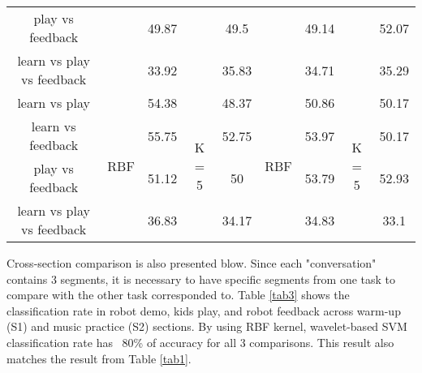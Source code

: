 \begin{sidewaystable}[tbp]
\begin{center}
{\begin{tabular}{ccccccccc}
			play vs feedback                                   &                             & 49.87    &                        & 49.5     &                             & 49.14    &                        & 52.07    \\
			learn vs play vs feedback                                 &                             & 33.92    &                        & 35.83    &                             & 34.71    &                        & 35.29    \\
			\hline
			learn vs play                                   & \multirow{4}{*}{RBF}        & 54.38    & \multirow{4}{*}{K = 5} & 48.37    & \multirow{4}{*}{RBF}        & 50.86    & \multirow{4}{*}{K = 5} & 50.17    \\
			learn vs feedback                                   &                             & 55.75    &                        & 52.75    &                             & 53.97    &                        & 50.17    \\
			play vs feedback                                   &                             & 51.12    &                        & 50       &                             & 53.79    &                        & 52.93    \\
			learn vs play vs feedback                                 &                             & 36.83    &                        & 34.17    &                             & 34.83    &                        & 33.1    \\
			\hline
		\end{tabular}

	}
		\label{tab2}
	\end{center}
\end{sidewaystable}

Cross-section comparison is also presented blow. Since each "conversation" contains 3 segments, it is 
necessary to have specific segments from one task to compare with the other task corresponded to. 
Table \ref{tab3} shows the classification rate in robot demo, kids play, and robot feedback across
warm-up (S1) and music practice (S2) sections. By using RBF kernel, wavelet-based SVM classification rate has
~80\% of accuracy for all 3 comparisons. This result also matches the result from Table \ref{tab1}. 

